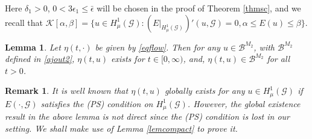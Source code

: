 \documentclass[10pt,a4paper]{article}
\newtheorem{lemma}[theorem]{Lemma}
\newtheorem{remark}[theorem]{Remark}
\theoremstyle{definition} \theoremstyle{remark}
\numberwithin{equation}{section}
\newcommand{\G}{\mathcal{G}}
\newcommand{\B}{\mathcal{B}}
\newcommand{\K}{\mathcal{K}}
\begin{document}
Here $\delta_1 > 0$, $0< 3\epsilon_1 \leq \bar{\epsilon}$ will be chosen in the proof of Theorem \ref{thmsc}, and we recall that $\K[\alpha,\beta] = \bigl\{u \in H^1_\mu(\G): (E|_{H^1_\mu(\G)})'(u,\G) = 0, \alpha \leq E(u) \leq \beta\bigr\}.$

\begin{lemma} \label{lemgloext}
	Let $\eta(t,\cdot)$ be given by \eqref{eqflow}. Then for any $u \in \B^{M_2}$, with $\B^{M_2}$ defined in \eqref{ajout2},  $\eta(t,u)$ exists for $t \in [0,\infty)$, and, $\eta(t,u) \in \B^{M_2}$ for all $t > 0$.
\end{lemma}

\begin{remark}
	 It is well known that $\eta(t,u)$ globally exists for any $u \in H^1_\mu(\G)$ if $E(\cdot,\G)$ satisfies the (PS) condition on $H^1_\mu(\G)$. However, the global existence result in the above lemma is not direct since the (PS) condition is lost in our setting. We shall make use of Lemma \ref{lemcompact} to prove it.
\end{remark}
\end{document}
